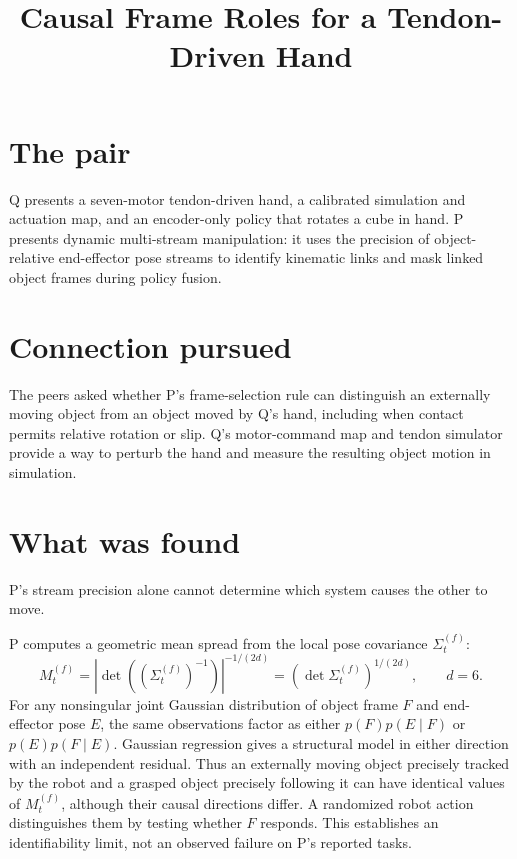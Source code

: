 \documentclass{article}
\title{Causal Frame Roles for a Tendon-Driven Hand}
\begin{document}
\maketitle

\section*{The pair}

Q presents a seven-motor tendon-driven hand, a calibrated simulation and actuation map, and an encoder-only policy that rotates a cube in hand. P presents dynamic multi-stream manipulation: it uses the precision of object-relative end-effector pose streams to identify kinematic links and mask linked object frames during policy fusion. 

\section*{Connection pursued}

The peers asked whether P's frame-selection rule can distinguish an externally moving object from an object moved by Q's hand, including when contact permits relative rotation or slip. Q's motor-command map and tendon simulator provide a way to perturb the hand and measure the resulting object motion in simulation. 

\section*{What was found}

\begin{claim}
P's stream precision alone cannot determine which system causes the other to move.
\end{claim}
P computes a geometric mean spread from the local pose covariance \(\Sigma_t^{(f)}\):
\[
M_t^{(f)}
= \left|\det\!\left((\Sigma_t^{(f)})^{-1}\right)\right|^{-1/(2d)}
= \left(\det\Sigma_t^{(f)}\right)^{1/(2d)},
\qquad d=6.
\]
For any nonsingular joint Gaussian distribution of object frame \(F\) and end-effector pose \(E\), the same observations factor as either \(p(F)p(E\mid F)\) or \(p(E)p(F\mid E)\). Gaussian regression gives a structural model in either direction with an independent residual. Thus an externally moving object precisely tracked by the robot and a grasped object precisely following it can have identical values of \(M_t^{(f)}\), although their causal directions differ. A randomized robot action distinguishes them by testing whether \(F\) responds. This establishes an identifiability limit, not an observed failure on P's reported tasks. 
\end{document}
